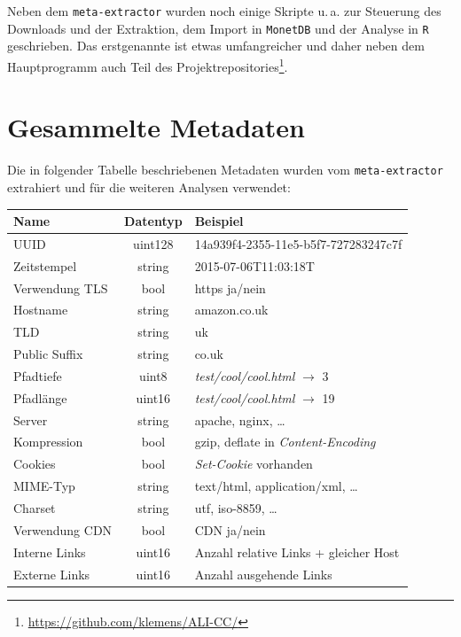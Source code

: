 \documentclass[a4paper,12pt,titlepage=false]{scrreprt}
\begin{document}
Neben dem \texttt{meta-extractor} wurden noch einige Skripte u.\,a. zur
Steuerung des Downloads und der Extraktion, dem Import in \texttt{MonetDB} und
der Analyse in \texttt{R} geschrieben. Das erstgenannte ist etwas umfangreicher
und daher neben dem Hauptprogramm auch Teil des
Projektrepositories\footnote{\url{https://github.com/klemens/ALI-CC/}}.

\section{Gesammelte Metadaten}
\label{csv-data}

Die in folgender Tabelle beschriebenen Metadaten wurden vom \texttt{meta-extractor}
extrahiert und für die weiteren Analysen verwendet:

\begin{center}
\begin{tabular}{lcl}
    \textbf{Name}  & \textbf{Datentyp} & \textbf{Beispiel} \\ \hline\hline
    UUID           & uint128           & \textcolor{light-gray}{14a939f4-2355-11e5-b5f7-727283247c7f} \\ \hline
    Zeitstempel    & string            & \textcolor{light-gray}{2015-07-06T11:03:18T} \\ \hline
    Verwendung TLS & bool              & https ja/nein \\ \hline
    Hostname       & string            & \textcolor{light-gray}{amazon.co.uk} \\ \hline
    TLD            & string            & \textcolor{light-gray}{uk} \\ \hline
    Public Suffix  & string            & \textcolor{light-gray}{co.uk} \\ \hline
    Pfadtiefe      & uint8             & \textit{test/cool/cool.html} $\rightarrow$ \textcolor{light-gray}{3} \\ \hline
    Pfadlänge      & uint16            & \textit{test/cool/cool.html} $\rightarrow$ \textcolor{light-gray}{19} \\ \hline
    Server         & string            & \textcolor{light-gray}{apache}, \textcolor{light-gray}{nginx}, \dots \\ \hline
    Kompression    & bool              & \textcolor{light-gray}{gzip}, \textcolor{light-gray}{deflate} in \textit{Content-Encoding} \\ \hline
    Cookies        & bool              & \textit{Set-Cookie} vorhanden \\ \hline
    MIME-Typ       & string            & \textcolor{light-gray}{text/html}, \textcolor{light-gray}{application/xml}, \dots\\ \hline
    Charset        & string            & \textcolor{light-gray}{utf}, \textcolor{light-gray}{iso-8859}, \dots \\ \hline
    Verwendung CDN & bool              & CDN ja/nein \\ \hline
    Interne Links  & uint16            & Anzahl relative Links + gleicher Host \\ \hline
    Externe Links  & uint16            & Anzahl ausgehende Links
\end{tabular}
\end{center}
\end{document}
